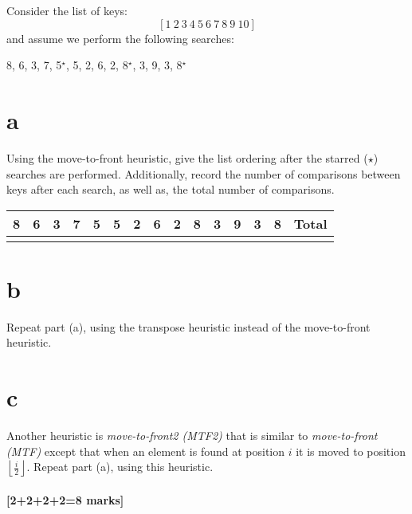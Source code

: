\documentclass[12pt]{article}
\begin{document}
	Consider the list of keys:
	\[
	[1\ 2\ 3\ 4\ 5\ 6\ 7\ 8\ 9\ 10]
	\]
	and assume we perform the following searches:
	\begin{center}
		8, 6, 3, 7, 5$^\star$, 5, 2, 6, 2, 8$^\star$, 3, 9, 3, 8$^\star$ 
	\end{center}
	\begin{enumerate}
		\part{a} Using the move-to-front heuristic, give the list ordering after the starred ($\star$) searches are performed. 
		Additionally, record the number of comparisons between keys after each search, as well as, the total number of comparisons.
		\begin{center}
			\begin{tabular}{|c|c|c|c|c|c|c|c|c|c|c|c|c|c||c|} \hline
				8 &  6 &  3 &  7 &  5 & 5 & 2 & 6 & 2 & 8 & 3 & 9 & 3 & 8  & Total \\ \hline
				& & & & & & & & & & & & & & \\ \hline
			\end{tabular}
		\end{center}
		
		\part{b} Repeat part (a), using the transpose heuristic instead of the move-to-front heuristic.
		
		\part{c} Another heuristic is \textit{move-to-front2 (MTF2)} that is similar to
		\textit{move-to-front (MTF)} except that when an element is found at position $i$ it is moved to position $\left \lfloor \frac{i}{2} \right \rfloor$.  
		Repeat part (a), using this heuristic.  
		
	\end{enumerate}
	
	
	\subsection{[2+2+2+2=8 marks]}
	
\end{document}
